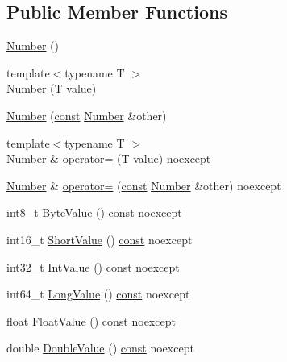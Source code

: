 \subsection*{Public Member Functions}
\begin{DoxyCompactItemize}
\item 
\mbox{\hyperlink{classlucene_1_1core_1_1util_1_1numeric_1_1Number_a6f7d606df5780fb44022a297469cf301}{Number}} ()
\item 
{\footnotesize template$<$typename T $>$ }\\\mbox{\hyperlink{classlucene_1_1core_1_1util_1_1numeric_1_1Number_a882d32da42457953ff689a78b6cfc06c}{Number}} (T value)
\item 
\mbox{\hyperlink{classlucene_1_1core_1_1util_1_1numeric_1_1Number_a20fd702a77592e0f37f83203882663ff}{Number}} (\mbox{\hyperlink{ZlibCrc32_8h_a2c212835823e3c54a8ab6d95c652660e}{const}} \mbox{\hyperlink{classlucene_1_1core_1_1util_1_1numeric_1_1Number}{Number}} \&other)
\item 
{\footnotesize template$<$typename T $>$ }\\\mbox{\hyperlink{classlucene_1_1core_1_1util_1_1numeric_1_1Number}{Number}} \& \mbox{\hyperlink{classlucene_1_1core_1_1util_1_1numeric_1_1Number_a9267cd182581260141c7bb35e431d083}{operator=}} (T value) noexcept
\item 
\mbox{\hyperlink{classlucene_1_1core_1_1util_1_1numeric_1_1Number}{Number}} \& \mbox{\hyperlink{classlucene_1_1core_1_1util_1_1numeric_1_1Number_a263e7f66bce840ef32738bff48db4a71}{operator=}} (\mbox{\hyperlink{ZlibCrc32_8h_a2c212835823e3c54a8ab6d95c652660e}{const}} \mbox{\hyperlink{classlucene_1_1core_1_1util_1_1numeric_1_1Number}{Number}} \&other) noexcept
\item 
int8\+\_\+t \mbox{\hyperlink{classlucene_1_1core_1_1util_1_1numeric_1_1Number_a0d359a6cf3b7f7f61f669f84411708a8}{Byte\+Value}} () \mbox{\hyperlink{ZlibCrc32_8h_a2c212835823e3c54a8ab6d95c652660e}{const}} noexcept
\item 
int16\+\_\+t \mbox{\hyperlink{classlucene_1_1core_1_1util_1_1numeric_1_1Number_a752109e10e001b12fb520334401bfa76}{Short\+Value}} () \mbox{\hyperlink{ZlibCrc32_8h_a2c212835823e3c54a8ab6d95c652660e}{const}} noexcept
\item 
int32\+\_\+t \mbox{\hyperlink{classlucene_1_1core_1_1util_1_1numeric_1_1Number_afeb2bcbe0798e196578cff1f5946f45b}{Int\+Value}} () \mbox{\hyperlink{ZlibCrc32_8h_a2c212835823e3c54a8ab6d95c652660e}{const}} noexcept
\item 
int64\+\_\+t \mbox{\hyperlink{classlucene_1_1core_1_1util_1_1numeric_1_1Number_ad37926a2bf4e84279ab97f584b1807d7}{Long\+Value}} () \mbox{\hyperlink{ZlibCrc32_8h_a2c212835823e3c54a8ab6d95c652660e}{const}} noexcept
\item 
float \mbox{\hyperlink{classlucene_1_1core_1_1util_1_1numeric_1_1Number_a757b8a62184cf1d85ee774fffdc380de}{Float\+Value}} () \mbox{\hyperlink{ZlibCrc32_8h_a2c212835823e3c54a8ab6d95c652660e}{const}} noexcept
\item 
double \mbox{\hyperlink{classlucene_1_1core_1_1util_1_1numeric_1_1Number_aa1ad1e93dddf1c59440ea49f39b510f1}{Double\+Value}} () \mbox{\hyperlink{ZlibCrc32_8h_a2c212835823e3c54a8ab6d95c652660e}{const}} noexcept
\end{DoxyCompactItemize}
